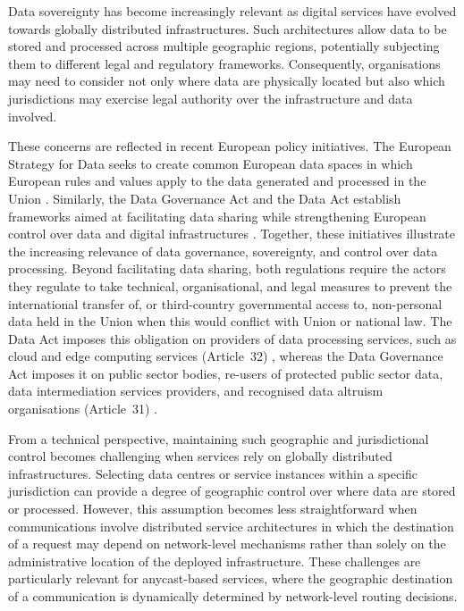 Data sovereignty has become increasingly relevant as digital services have evolved towards globally distributed infrastructures. Such architectures allow data to be stored and processed across multiple geographic regions, potentially subjecting them to different legal and regulatory frameworks. Consequently, organisations may need to consider not only where data are physically located but also which jurisdictions may exercise legal authority over the infrastructure and data involved.

These concerns are reflected in recent European policy initiatives. The European Strategy for Data seeks to create common European data spaces in which European rules and values apply to the data generated and processed in the Union \cite{COMMUNICATIONData}. Similarly, the Data Governance Act and the Data Act establish frameworks aimed at facilitating data sharing while strengthening European control over data and digital infrastructures \cite{2022DataActb,2022DataAct}. Together, these initiatives illustrate the increasing relevance of data governance, sovereignty, and control over data processing. Beyond facilitating data sharing, both regulations require the actors they regulate to take technical, organisational, and legal measures to prevent the international transfer of, or third-country governmental access to, non-personal data held in the Union when this would conflict with Union or national law. The Data Act imposes this obligation on providers of data processing services, such as cloud and edge computing services (Article~32) \cite{2022DataAct}, whereas the Data Governance Act imposes it on public sector bodies, re-users of protected public sector data, data intermediation services providers, and recognised data altruism organisations (Article~31) \cite{2022DataActb}.

From a technical perspective, maintaining such geographic and jurisdictional control becomes challenging when services rely on globally distributed infrastructures. Selecting data centres or service instances within a specific jurisdiction can provide a degree of geographic control over where data are stored or processed. However, this assumption becomes less straightforward when communications involve distributed service architectures in which the destination of a request may depend on network-level mechanisms rather than solely on the administrative location of the deployed infrastructure. These challenges are particularly relevant for anycast-based services, where the geographic destination of a communication is dynamically determined by network-level routing decisions.

